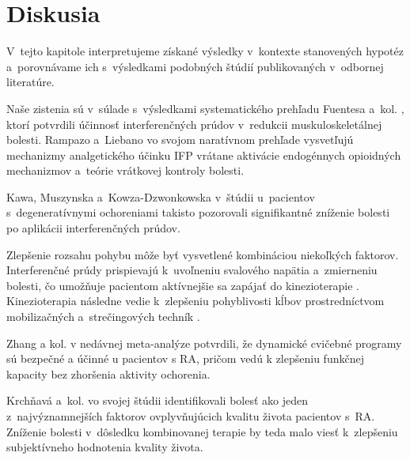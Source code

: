 ﻿%

\chapter{Diskusia}

V~tejto kapitole interpretujeme získané výsledky v~kontexte stanovených hypotéz a~porovnávame ich s~výsledkami podobných štúdií publikovaných v~odbornej literatúre.



Naše zistenia sú v~súlade s~výsledkami systematického prehľadu Fuentesa a~kol. \parencite*{Fuentes2010}, ktorí potvrdili účinnosť interferenčných prúdov v~redukcii muskuloskeletálnej bolesti. Rampazo a~Liebano \parencite*{Rampazo2022} vo svojom naratívnom prehľade vysvetľujú mechanizmy analgetického účinku IFP vrátane aktivácie endogénnych opioidných mechanizmov a~teórie vrátkovej kontroly bolesti.

Kawa, Muszynska a~Kowza-Dzwonkowska \parencite*{Kawa2014} v~štúdii u~pacientov s~degeneratívnymi ochoreniami takisto pozorovali signifikantné zníženie bolesti po aplikácii interferenčných prúdov.


Zlepšenie rozsahu pohybu môže byť vysvetlené kombináciou niekoľkých faktorov. Interferenčné prúdy prispievajú k~uvoľneniu svalového napätia a~zmierneniu bolesti, čo umožňuje pacientom aktívnejšie sa zapájať do kinezioterapie \parencite{Watson2020}. Kinezioterapia následne vedie k~zlepšeniu pohyblivosti kĺbov prostredníctvom mobilizačných a~strečingových techník \parencite{Kolar2012}.

Zhang a kol. \parencite*{Zhang2025} v nedávnej meta-analýze potvrdili, že dynamické cvičebné programy sú bezpečné a účinné u pacientov s RA, pričom vedú k zlepšeniu funkčnej kapacity bez zhoršenia aktivity ochorenia.


Krchňavá a~kol. \parencite*{Krchnava2018} vo svojej štúdii identifikovali bolesť ako jeden z~najvýznamnejších faktorov ovplyvňujúcich kvalitu života pacientov s~RA. Zníženie bolesti v~dôsledku kombinovanej terapie by teda malo viesť k~zlepšeniu subjektívneho hodnotenia kvality života.

